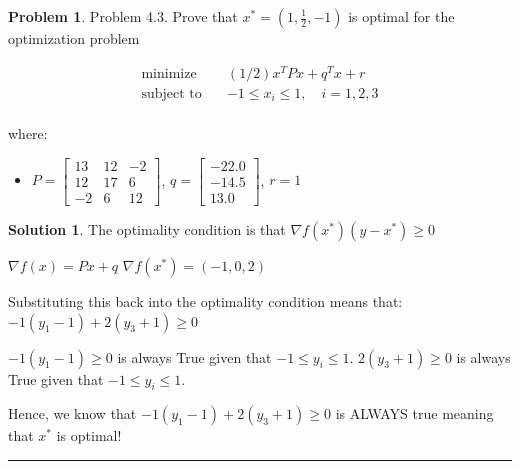 \documentclass{article}
\theoremstyle{definition}
\newtheorem{problem}{Problem}
\def\fline{\rule{0.75\linewidth}{0.5pt}}
\newcommand{\finishline}{\begin{center}\fline\end{center}}
\newtheorem*{solution*}{Solution}
\newenvironment{solution}{\begin{solution*}}{{\finishline} \end{solution*}}
\begin{document}
\begin{problem}
    Problem 4.3. Prove that $x^* = (1, \frac{1}{2}, -1)$ is optimal for the optimization problem

    \begin{align*}
\text{minimize} \quad & (1/2)x^TPx + q^Tx + r \\
\text{subject to} \quad & -1 \leq x_i \leq 1, \quad i = 1, 2, 3\\
\end{align*}

where:
\begin{itemize}
    \item $P = \begin{bmatrix}
13 & 12 & -2 \\
12 & 17 & 6 \\
-2 & 6 & 12
\end{bmatrix}$, $q = \begin{bmatrix}
-22.0\\
-14.5\\
13.0
\end{bmatrix}$, $r = 1$
\end{itemize}

\begin{solution}
    The optimality condition is that $\nabla f(x^*) (y - x^*) \geq 0$

    $\nabla f(x) = Px + q$ \newline 
    $\nabla f(x^*) = (-1, 0, 2)$

Substituting this back into the optimality condition means that: \newline 
$-1 (y_1 - 1) + 2 (y_3 + 1) \geq 0$

$-1(y_1 - 1) \geq 0$ is always True given that $-1 \leq y_i \leq 1$.  \newline 
$2 (y_3 + 1) \geq 0$ is always True given that $-1 \leq y_i \leq 1$. 

Hence, we know that $-1 (y_1 - 1) + 2 (y_3 + 1) \geq 0$ is ALWAYS true meaning that $x^*$ is optimal!
    
\end{solution}
\end{problem}
\end{document}
